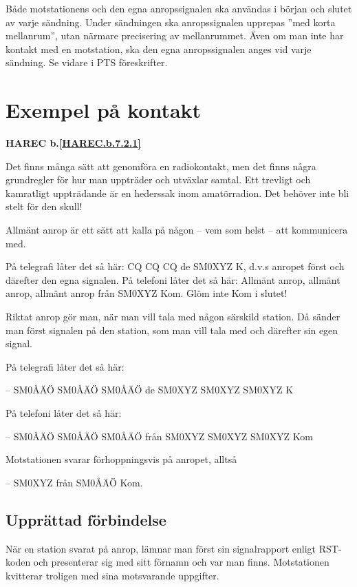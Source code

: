 Både motstationens och den egna anropssignalen ska användas i början
och slutet av varje sändning. Under sändningen ska anropssignalen
upprepas ''med korta mellanrum'', utan närmare precisering av
mellanrummet. Även om man inte har kontakt med en motstation, ska
den egna anropssignalen anges vid varje sändning. Se vidare i PTS
föreskrifter.


\section{Exempel på kontakt}
\textbf{HAREC
  b.\ref{HAREC.b.7.2.1}\label{myHAREC.b.7.2.1}
}

Det finns många sätt att genomföra en radiokontakt, men det finns
några grundregler för hur man uppträder och utväxlar samtal. Ett
trevligt och kamratligt uppträdande är en hederssak inom
amatörradion. Det behöver inte bli stelt för den skull!

Allmänt anrop är ett sätt att kalla på någon
-- vem som helst -- att kommunicera med.

På telegrafi låter det så här: CQ CQ CQ de SM0XYZ K, d.v.s anropet
först och därefter den egna signalen. På telefoni låter det så här:
Allmänt anrop, allmänt anrop, allmänt anrop från SM0XYZ Kom. Glöm inte
Kom i slutet!

Riktat anrop gör man, när man vill tala med någon särskild station. Då
sänder man först signalen på den station, som man vill tala med och
därefter sin egen signal.

På telegrafi låter det så här:

-- SM0ÅÄÖ SM0ÅÄÖ SM0ÅÄÖ de SM0XYZ SM0XYZ SM0XYZ K

På telefoni låter det så här:

-- SM0ÅÄÖ SM0ÅÄÖ SM0ÅÄÖ från SM0XYZ SM0XYZ SM0XYZ Kom

Motstationen svarar förhoppningsvis på anropet, alltså

-- SM0XYZ från SM0ÅÄÖ Kom.

\subsection{Upprättad förbindelse}

När en station svarat på anrop, lämnar man först sin signalrapport
enligt RST-koden och presenterar sig med sitt förnamn och var man
finns. Motstationen kvitterar troligen med sina motsvarande
uppgifter.

